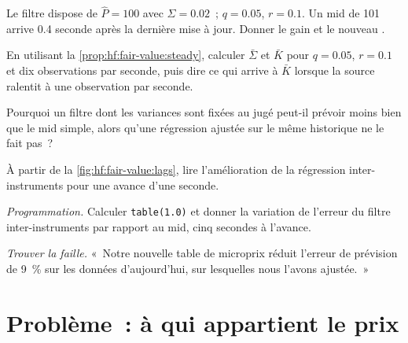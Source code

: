 \begin{exercise}[$\star$]\label{exo:hf:fair-value:3}
Le filtre dispose de $\hat P=100$ avec $\Sigma=0.02$~; $q=0.05$, $r=0.1$. Un mid de 101 arrive 0.4 seconde après la dernière mise à jour. Donner le gain et le nouveau
.
\end{exercise}

\begin{exercise}[$\star\star$]\label{exo:hf:fair-value:4}
En utilisant la \cref{prop:hf:fair-value:steady}, calculer $\bar\Sigma$ et $\bar K$ pour $q=0.05$, $r=0.1$ et dix observations par seconde, puis dire ce
qui arrive à $\bar K$ lorsque la source ralentit à une observation par seconde.
\end{exercise}

\begin{exercise}[$\star\star$]\label{exo:hf:fair-value:5}
Pourquoi un filtre dont les variances sont fixées au jugé peut-il prévoir moins bien que le mid simple, alors qu'une régression ajustée sur le même historique ne le fait pas~?
\end{exercise}

\begin{exercise}[$\star\star$]\label{exo:hf:fair-value:6}
À partir de la \cref{fig:hf:fair-value:lags}, lire l'amélioration de la régression inter-instruments pour une avance d'une seconde.
\end{exercise}

\begin{exercise}[$\star\star\star$]\label{exo:hf:fair-value:7}
\emph{Programmation.} Calculer \texttt{table(1.0)} et donner la variation de l'erreur du filtre inter-instruments par rapport au mid, cinq secondes à l'avance.
\end{exercise}

\begin{exercise}[$\star\star\star$]\label{exo:hf:fair-value:8}
\emph{Trouver la faille.} «~Notre nouvelle table de microprix réduit l'erreur de prévision de 9~\% sur les données d'aujourd'hui, sur lesquelles nous l'avons ajustée.~»
\end{exercise}

\section{Problème~: à qui appartient le prix}

